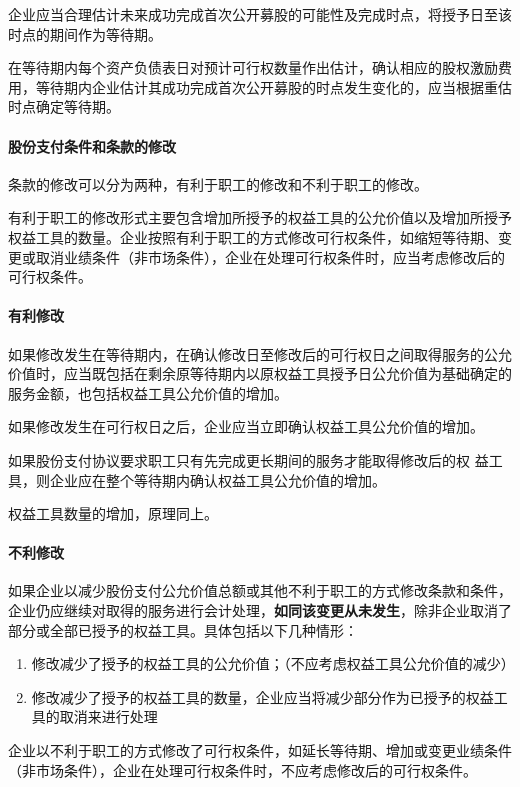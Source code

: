 \documentclass[UTF8,12pt]{ctexart}
\numberwithin{equation}{section} %
\numberwithin{figure}{section}
\numberwithin{table}{section}
\begin{document}
	企业应当合理估计未来成功完成首次公开募股的可能性及完成时点，将授予日至该时点的期间作为等待期。
	
	在等待期内每个资产负债表日对预计可行权数量作出估计，确认相应的股权激励费用，等待期内企业估计其成功完成首次公开募股的时点发生变化的，应当根据重估时点确定等待期。
	
	\paragraph{股份支付条件和条款的修改}
	条款的修改可以分为两种，有利于职工的修改和不利于职工的修改。
	
	有利于职工的修改形式主要包含增加所授予的权益工具的公允价值以及增加所授予权益工具的数量。企业按照有利于职工的方式修改可行权条件，如缩短等待期、变更或取消业绩条件（非市场条件），企业在处理可行权条件时，应当考虑修改后的可行权条件。
	
	\paragraph{有利修改}
	如果修改发生在等待期内，在确认修改日至修改后的可行权日之间取得服务的公允价值时，应当既包括在剩余原等待期内以原权益工具授予日公允价值为基础确定的服务金额，也包括权益工具公允价值的增加。
	
	如果修改发生在可行权日之后，企业应当立即确认权益工具公允价值的增加。
	
	如果股份支付协议要求职工只有先完成更长期间的服务才能取得修改后的权  益工具，则企业应在整个等待期内确认权益工具公允价值的增加。
	
	权益工具数量的增加，原理同上。
	
	\paragraph{不利修改}
	如果企业以减少股份支付公允价值总额或其他不利于职工的方式修改条款和条件，企业仍应继续对取得的服务进行会计处理，\textbf{如同该变更从未发生}，除非企业取消了部分或全部已授予的权益工具。具体包括以下几种情形：
	\begin{enumerate}
		\item 修改减少了授予的权益工具的公允价值；（不应考虑权益工具公允价值的减少）
		
		\item 修改减少了授予的权益工具的数量，企业应当将减少部分作为已授予的权益工具的取消来进行处理
	\end{enumerate}
	
	企业以不利于职工的方式修改了可行权条件，如延长等待期、增加或变更业绩条件（非市场条件），企业在处理可行权条件时，不应考虑修改后的可行权条件。
	
\end{document}
